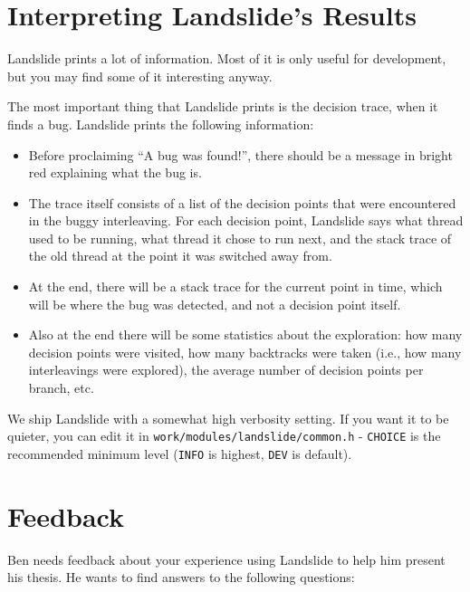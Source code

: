 \documentclass{article}
\begin{document}
\section{Interpreting Landslide's Results}

Landslide prints a lot of information. Most of it is only useful for development, but you may find some of it interesting anyway.

The most important thing that Landslide prints is the decision trace, when it finds a bug. Landslide prints the following information:

\begin{itemize}
	\item Before proclaiming ``A bug was found!'', there should be a message in bright red explaining what the bug is.
	\item The trace itself consists of a list of the decision points that were encountered in the buggy interleaving. For each decision point, Landslide says what thread used to be running, what thread it chose to run next, and the stack trace of the old thread at the point it was switched away from.
	\item At the end, there will be a stack trace for the current point in time, which will be where the bug was detected, and not a decision point itself.
	\item Also at the end there will be some statistics about the exploration: how many decision points were visited, how many backtracks were taken (i.e., how many interleavings were explored), the average number of decision points per branch, etc.
\end{itemize}

We ship Landslide with a somewhat high verbosity setting. If you want it to be quieter, you can edit it in \texttt{work/modules/landslide/common.h} - \texttt{CHOICE} is the recommended minimum level (\texttt{INFO} is highest, \texttt{DEV} is default).

\section{Feedback}
\label{sec:feedback}

Ben needs feedback about your experience using Landslide to help him present his thesis. He wants to find answers to the following questions:
\end{document}
